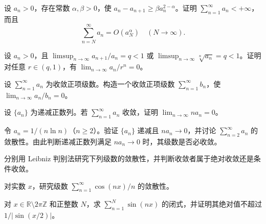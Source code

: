 \noindent\begin{minipage}{\textwidth}
设 $a_n>0$，存在常数 $\alpha,\beta>0$，使 $a_n-a_{n+1}\ge\beta a_n^{2-\alpha}$。证明 $\sum_{n=1}^{\infty}a_n<+\infty$，而且\[\sum_{n=N}^{\infty}a_n=O(a_N^\alpha)\quad(N\to\infty).\]
\end{minipage}\par\vfill
\newpage
\noindent\begin{minipage}{\textwidth}
设 $a_n>0$，且 $\limsup_{n\to\infty}a_{n+1}/a_n=q<1$ 或 $\limsup_{n\to\infty}\sqrt[n]{a_n}=q<1$。证明对任意 $r\in(q,1)$，有 $\lim_{n\to\infty}a_n/r^n=0$。
\end{minipage}\par\vfill
\noindent\begin{minipage}{\textwidth}
设 $\sum_{n=1}^{\infty}a_n$ 为收敛正项级数。构造一个收敛正项级数 $\sum_{n=1}^{\infty}b_n$，使 $\lim_{n\to\infty}a_n/b_n=0$。
\end{minipage}\par\vfill
\noindent\begin{minipage}{\textwidth}
设 $\{a_n\}$ 为递减正数列。若 $\sum_{n=1}^{\infty}a_n$ 收敛，证明 $\lim_{n\to\infty}na_n=0$。
\end{minipage}\par\vfill
\newpage
\noindent\begin{minipage}{\textwidth}
令 $a_n=1/(n\ln n)$（$n\ge2$）。验证 $\{a_n\}$ 递减且 $na_n\to0$，并讨论 $\displaystyle\sum_{n=2}^{\infty}a_n$ 的敛散性。由此判断递减正数列满足 $na_n\to0$ 时，其级数是否必收敛。
\end{minipage}\par\vfill
\noindent\begin{minipage}{\textwidth}
分别用 Leibniz 判别法研究下列级数的敛散性，并判断收敛者属于绝对收敛还是条件收敛。
\end{minipage}\par\vfill
\noindent\begin{minipage}{\textwidth}
对实数 $x$，研究级数 $\sum_{n=1}^{\infty}\cos(nx)/n$ 的敛散性。
\end{minipage}\par\vfill
\newpage
\noindent\begin{minipage}{\textwidth}
对 $x\in\mathbb R\setminus2\pi\mathbb Z$ 和正整数 $N$，求 $\displaystyle\sum_{n=1}^N\sin(nx)$ 的闭式，并证明其绝对值不超过 $1/|\sin(x/2)|$。
\end{minipage}\par\vfill
